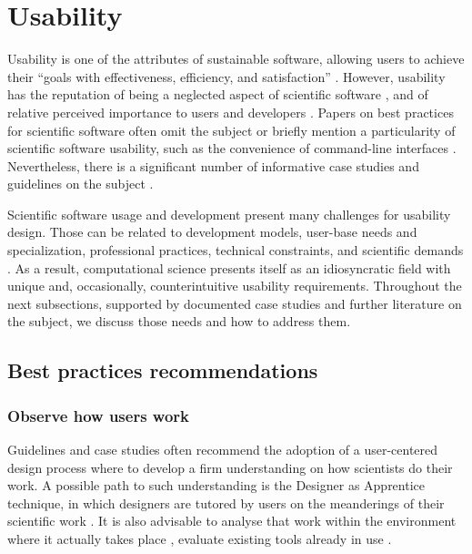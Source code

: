 \section{Usability}
\label{sec:usability}

Usability is one of the attributes of sustainable software, allowing users to achieve their “goals with effectiveness, efficiency, and satisfaction” \cite[p.3]{Venters_WSSSPE}. However, usability has the reputation of being a neglected aspect of scientific software \cite{Ahmed:2014}, and of relative perceived importance to users and developers \cite{Nguyen-Hoan:2010, Hucka:2016}. Papers on best practices for scientific software often omit the subject \cite{Stodden_WSSSPE, Wilson:2016} or briefly mention a particularity of scientific software usability, such as the convenience of command-line interfaces \cite{bestprSC}. Nevertheless, there is a significant number of informative case studies and guidelines on the subject \cite{Springmeyer:1993, Pancake:1996, Javahery:2004, Schraefel:2004,Letondal:2004, Talbott:2005, Macaulay:2009, DeRoure:2009, Keefe:2010, DeMatos:2013, Ahmed:2014}.

Scientific software usage and development present many challenges for usability design. Those can be related to development models, user-base needs and specialization, professional practices, technical constraints, and scientific demands \cite{Queiroz:2016}. As a result, computational science presents itself as an idiosyncratic field with unique and, occasionally, counterintuitive usability requirements. Throughout the next subsections, supported by documented case studies and further literature on the subject, we discuss those needs and how to address them. 

\subsection{Best practices recommendations}

\subsubsection{Observe how users work}

Guidelines and case studies often recommend the adoption of a user-centered design process where to develop a firm understanding on how scientists do their work. A possible path to such understanding is the Designer as Apprentice technique, in which designers are tutored by users on the meanderings of their scientific work \cite{Springmeyer:1993}.  It is also advisable to analyse that work within the environment where it actually takes place \cite{Pancake:1996}, evaluate existing tools already in use \cite{Javahery:2004}.  


